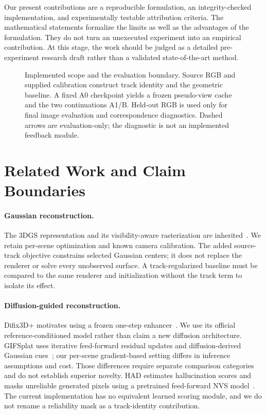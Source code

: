 \documentclass[10pt,twocolumn,letterpaper]{article}
\begin{document}
Our present contributions are a reproducible formulation, an integrity-checked implementation, and experimentally testable attribution criteria. The mathematical statements formalize the limits as well as the advantages of the formulation. They do not turn an unexecuted experiment into an empirical contribution. At this stage, the work should be judged as a detailed pre-experiment research draft rather than a validated state-of-the-art method.

\begin{figure}[t]
\centering

\caption{Implemented scope and the evaluation boundary. Source RGB and supplied calibration construct track identity and the geometric baseline. A fixed A0 checkpoint yields a frozen pseudo-view cache and the two continuations A1/B. Held-out RGB is used only for final image evaluation and correspondence diagnostics. Dashed arrows are evaluation-only; the diagnostic is not an implemented feedback module.}
\label{fig:pipeline}
\end{figure}

\section{Related Work and Claim Boundaries}
\paragraph{Gaussian reconstruction.} The 3DGS representation and its visibility-aware rasterization are inherited~\citep{kerbl2023gaussians}. We retain per-scene optimization and known camera calibration. The added source-track objective constrains selected Gaussian centers; it does not replace the renderer or solve every unobserved surface. A track-regularized baseline must be compared to the same renderer and initialization without the track term to isolate its effect.

\paragraph{Diffusion-guided reconstruction.} Difix3D+ motivates using a frozen one-step enhancer~\citep{wu2025difix}. We use its official reference-conditioned model rather than claim a new diffusion architecture. GIFSplat uses iterative feed-forward residual updates and diffusion-derived Gaussian cues~\citep{chen2026gifsplat}; our per-scene gradient-based setting differs in inference assumptions and cost. Those differences require separate comparison categories and do not establish superior novelty. HAD estimates hallucination scores and masks unreliable generated pixels using a pretrained feed-forward NVS model~\citep{liu2026had}. The current implementation has no equivalent learned scoring module, and we do not rename a reliability mask as a track-identity contribution.
\end{document}
